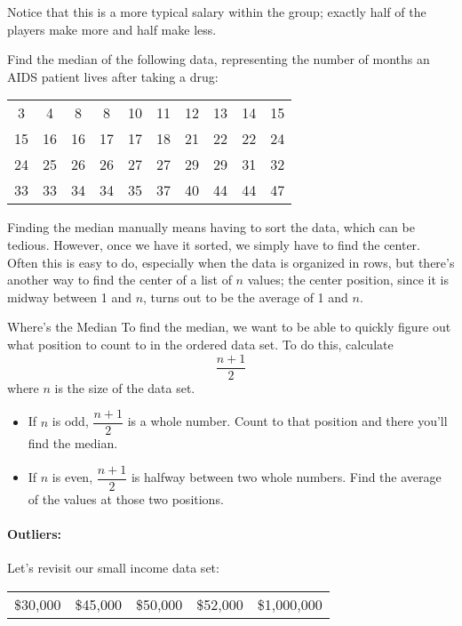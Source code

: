 Notice that this is a more typical salary within the group; exactly half of the players make more and half make less.

\begin{try}
Find the median of the following data, representing the number of months an AIDS patient lives after taking a drug:
\begin{center}
\begin{tabular}{c c c c c c c c c c}
3 & 4 & 8 & 8 & 10 & 11 & 12 & 13 & 14 & 15\\
15 & 16 & 16 & 17 & 17 & 18 & 21 & 22 & 22 & 24\\
24 & 25 & 26 & 26 & 27 & 27 & 29 & 29 & 31 & 32\\
33 & 33 & 34 & 34 & 35 & 37 & 40 & 44 & 44 & 47\\
\end{tabular}
\end{center}
\end{try}

Finding the median manually means having to sort the data, which can be tedious.  However, once we have it sorted, we simply have to find the center.  Often this is easy to do, especially when the data is organized in rows, but there's another way to find the center of a list of $n$ values; the center position, since it is midway between 1 and $n$, turns out to be the average of 1 and $n$.
\vfill
\pagebreak

\begin{proc}{Where's the Median}
To find the median, we want to be able to quickly figure out what position to count to in the ordered data set.  To do this, calculate \[\dfrac{n+1}{2}\] where $n$ is the size of the data set.
\end{proc}

\begin{itemize}
\item If $n$ is odd, $\dfrac{n+1}{2}$ is a whole number.  Count to that position and there you'll find the median.
\item If $n$ is even, $\dfrac{n+1}{2}$ is halfway between two whole numbers.  Find the average of the values at those two positions.
\end{itemize}

\paragraph{Outliers:} Let's revisit our small income data set:
\begin{center}
\begin{tabular}{c c c c c}
\$30,000 & \$45,000 & \$50,000 & \$52,000 & \$1,000,000
\end{tabular}
\end{center}

